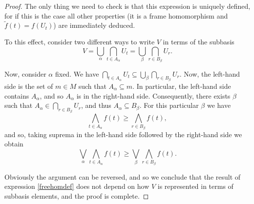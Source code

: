 \documentclass{article}
\theoremstyle{definition}
\theoremstyle{plain}
\begin{document}
\begin{proof}
The only thing we need to check is that this expression is uniquely defined, for if this is the case all other properties (it is a frame homomorphism and $\tilde f(t) = f(U_t)$) are immediately deduced.

To this effect, consider two different ways to write $V$ in terms of the subbasis
\[V = \bigcup_\alpha \bigcap_{t \in A_\alpha} U_t = \bigcup_\beta \bigcap_{r \in B_\beta} U_r.\]

Now, consider $\alpha$ fixed. We have $\bigcap_{t \in A_\alpha} U_t \subseteq \bigcup_\beta \bigcap_{r \in B_\beta} U_r$. Now, the left-hand side is the set of $m \in M$ such that $A_\alpha \subseteq m$. In particular, the left-hand side contains $A_\alpha$, and so $A_\alpha$ is in the right-hand side. Consequently, there exists $\beta$ such that $A_\alpha \in \bigcap_{r \in B_\beta} U_r$, and thus $A_\alpha \subseteq B_\beta$. For this particular $\beta$ we have
\[\bigwedge_{t \in A_\alpha} f(t) \geq \bigwedge_{r \in B_\beta} f(t),\]
and so, taking suprema in the left-hand side followed by the right-hand side we obtain
\[\bigvee_\alpha \bigwedge_{t \in A_\alpha} f(t) \geq \bigvee_\beta \bigwedge_{r \in B_\beta} f(t).\]

Obviously the argument can be reversed, and so we conclude that the result of expression \eqref{freehomdef} does not depend on how $V$ is represented in terms of subbasis elements, and the proof is complete.
\end{proof}

{}

\end{document}
